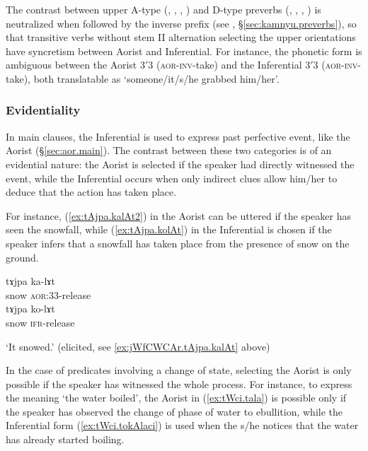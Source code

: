 The contrast between upper A-type (, , , ) and D-type preverbs (, , , ) is neutralized when followed by the inverse prefix (see , §\ref{sec:kamnyu.preverbs}), so that transitive verbs without stem II alternation selecting the upper orientations have syncretism between Aorist and Inferential. For instance, the phonetic form  is ambiguous between the Aorist 3$'$\fl{}3  (\textsc{aor}-\textsc{inv}-take) and the Inferential 3$'$\fl{}3  (\textsc{aor}-\textsc{inv}-take), both translatable as `someone/it/s/he grabbed him/her'.

\subsubsection{Evidentiality}   \label{sec:ifr.evd}
In main clauses, the Inferential is used to express past perfective event, like the Aorist (§\ref{sec:aor.main}). The contrast between these two categories is of an evidential nature: the Aorist is selected if the speaker had directly witnessed the event, while the Inferential occurs when only indirect clues allow him/her to deduce that the action has taken place.

For instance, (\ref{ex:tAjpa.kalAt2}) in the Aorist can be uttered if the speaker has seen the snowfall, while (\ref{ex:tAjpa.kolAt}) in the Inferential is chosen if the speaker infers that a snowfall has taken place from the presence of snow on the ground.

\begin{exe}
\ex 
\begin{xlist}
\ex \label{ex:tAjpa.kalAt2}
\gll tɤjpa ka-lɤt \\
snow \textsc{aor}:3\fl{}3-release \\
\ex \label{ex:tAjpa.kolAt}
\gll tɤjpa ko-lɤt \\
snow \textsc{ifr}-release \\
\end{xlist}
\glt `It snowed.' (elicited, see \ref{ex:jWfCWCAr.tAjpa.kalAt} above)
\end{exe}

In the case of predicates involving a change of state, selecting the Aorist is only possible if the speaker has witnessed the whole process. For instance, to express the meaning `the water boiled', the Aorist in (\ref{ex:tWci.tala}) is possible only if the speaker has observed the change of phase of water to ebullition, while the Inferential form (\ref{ex:tWci.tokAlaci}) is used when the s/he notices that the water has already started boiling.

